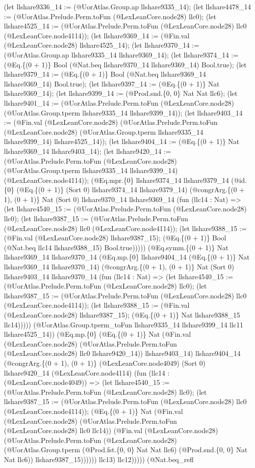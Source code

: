 \documentclass[11pt]{article}
\begin{document}
(let llshare9336\_14 := (@UorAtlas.Group.ap llshare9335\_14); (let llshare4478\_14 := (@UorAtlas.Prelude.Perm.toFun (@LexLeanCore.node28) llc0); (let llshare4525\_14 := (@UorAtlas.Prelude.Perm.toFun (@LexLeanCore.node28) llc0 (@LexLeanCore.node4114)); (let llshare9369\_14 := (@Fin.val (@LexLeanCore.node28) llshare4525\_14); (let llshare9370\_14 := (@UorAtlas.Group.ap llshare9335\_14 llshare9369\_14); (let llshare9374\_14 := (@Eq.\{(0 + 1)\} Bool (@Nat.beq llshare9370\_14 llshare9369\_14) Bool.true); (let llshare9379\_14 := (@Eq.\{(0 + 1)\} Bool (@Nat.beq llshare9369\_14 llshare9369\_14) Bool.true); (let llshare9397\_14 := (@Eq.\{(0 + 1)\} Nat llshare9369\_14); (let llshare9399\_14 := (@Prod.snd.\{0, 0\} Nat Nat llc6); (let llshare9401\_14 := (@UorAtlas.Prelude.Perm.toFun (@LexLeanCore.node28) (@UorAtlas.Group.tperm llshare9335\_14 llshare9399\_14)); (let llshare9403\_14 := (@Fin.val (@LexLeanCore.node28) (@UorAtlas.Prelude.Perm.toFun (@LexLeanCore.node28) (@UorAtlas.Group.tperm llshare9335\_14 llshare9399\_14) llshare4525\_14)); (let llshare9404\_14 := (@Eq.\{(0 + 1)\} Nat llshare9369\_14 llshare9403\_14); (let llshare9420\_14 := (@UorAtlas.Prelude.Perm.toFun (@LexLeanCore.node28) (@UorAtlas.Group.tperm llshare9335\_14 llshare9399\_14) (@LexLeanCore.node4114)); (@Eq.mpr.\{0\} llshare9374\_14 llshare9379\_14 (@id.\{0\} (@Eq.\{(0 + 1)\} (Sort 0) llshare9374\_14 llshare9379\_14) (@congrArg.\{(0 + 1), (0 + 1)\} Nat (Sort 0) llshare9370\_14 llshare9369\_14 (fun (llc14 : Nat) => (let llshare4540\_15 := (@UorAtlas.Prelude.Perm.toFun (@LexLeanCore.node28) llc0); (let llshare9387\_15 := (@UorAtlas.Prelude.Perm.toFun (@LexLeanCore.node28) llc0 (@LexLeanCore.node4114)); (let llshare9388\_15 := (@Fin.val (@LexLeanCore.node28) llshare9387\_15); (@Eq.\{(0 + 1)\} Bool (@Nat.beq llc14 llshare9388\_15) Bool.true))))) (@Eq.symm.\{(0 + 1)\} Nat llshare9369\_14 llshare9370\_14 (@Eq.mp.\{0\} llshare9404\_14 (@Eq.\{(0 + 1)\} Nat llshare9369\_14 llshare9370\_14) (@congrArg.\{(0 + 1), (0 + 1)\} Nat (Sort 0) llshare9403\_14 llshare9370\_14 (fun (llc14 : Nat) => (let llshare4540\_15 := (@UorAtlas.Prelude.Perm.toFun (@LexLeanCore.node28) llc0); (let llshare9387\_15 := (@UorAtlas.Prelude.Perm.toFun (@LexLeanCore.node28) llc0 (@LexLeanCore.node4114)); (let llshare9388\_15 := (@Fin.val (@LexLeanCore.node28) llshare9387\_15); (@Eq.\{(0 + 1)\} Nat llshare9388\_15 llc14))))) (@UorAtlas.Group.tperm\_toFun llshare9335\_14 llshare9399\_14 llc11 llshare4525\_14)) (@Eq.mp.\{0\} (@Eq.\{(0 + 1)\} Nat (@Fin.val (@LexLeanCore.node28) (@UorAtlas.Prelude.Perm.toFun (@LexLeanCore.node28) llc0 llshare9420\_14)) llshare9403\_14) llshare9404\_14 (@congrArg.\{(0 + 1), (0 + 1)\} (@LexLeanCore.node4049) (Sort 0) llshare9420\_14 (@LexLeanCore.node4114) (fun (llc14 : (@LexLeanCore.node4049)) => (let llshare4540\_15 := (@UorAtlas.Prelude.Perm.toFun (@LexLeanCore.node28) llc0); (let llshare9387\_15 := (@UorAtlas.Prelude.Perm.toFun (@LexLeanCore.node28) llc0 (@LexLeanCore.node4114)); (@Eq.\{(0 + 1)\} Nat (@Fin.val (@LexLeanCore.node28) (@UorAtlas.Prelude.Perm.toFun (@LexLeanCore.node28) llc0 llc14)) (@Fin.val (@LexLeanCore.node28) (@UorAtlas.Prelude.Perm.toFun (@LexLeanCore.node28) (@UorAtlas.Group.tperm (@Prod.fst.\{0, 0\} Nat Nat llc6) (@Prod.snd.\{0, 0\} Nat Nat llc6)) llshare9387\_15)))))) llc13) llc12))))) (@Nat.beq\_refl 
\end{document}
